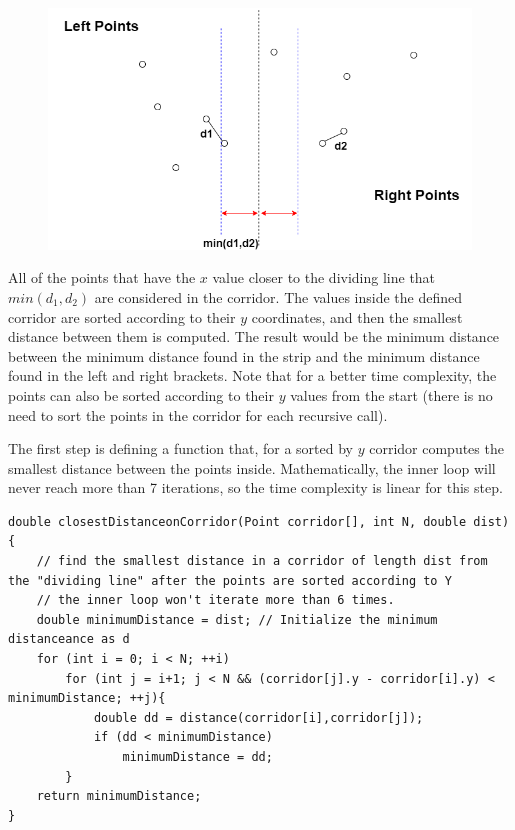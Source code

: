 \documentclass[letterpaper]{article}
\begin{document}
\newpage

\begin{figure} [h!]
\centering
\includegraphics[width=1\textwidth]{pngOfDiagrams/closestpair4.png}
\end{figure}

All of the points that have the $x$ value closer to the dividing line that $min(d_1, d_2)$ are considered in the corridor. The values inside the defined corridor are sorted according to their $y$ coordinates, and then the smallest distance between them is computed. The result would be the minimum distance between the minimum distance found in the strip and the minimum distance found in the left and right brackets. Note that for a better time complexity, the points can also be sorted according to their $y$ values from the start (there is no need to sort the points in the corridor for each recursive call).

The first step is defining a function that, for a sorted by $y$ corridor computes the smallest distance between the points inside. Mathematically, the inner loop will never reach more than 7 iterations, so the time complexity is linear for this step.

\begin{lstlisting}
double closestDistanceonCorridor(Point corridor[], int N, double dist){
    // find the smallest distance in a corridor of length dist from the "dividing line" after the points are sorted according to Y
    // the inner loop won't iterate more than 6 times.
	double minimumDistance = dist; // Initialize the minimum distanceance as d
	for (int i = 0; i < N; ++i)
		for (int j = i+1; j < N && (corridor[j].y - corridor[i].y) < minimumDistance; ++j){
            double dd = distance(corridor[i],corridor[j]);
			if (dd < minimumDistance)
				minimumDistance = dd;
		}
	return minimumDistance;
} 
\end{lstlisting}
\end{document}
